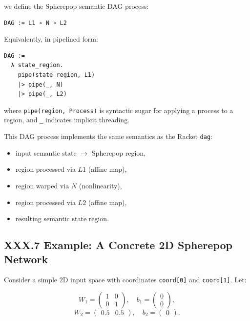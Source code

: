 \documentclass[12pt,letterpaper]{article}
\begin{document}
we define the Spherepop semantic DAG process:

\begin{verbatim}
DAG := L1 ∘ N ∘ L2
\end{verbatim}

Equivalently, in pipelined form:

\begin{verbatim}
DAG :=
  λ state_region.
    pipe(state_region, L1)
    |> pipe(_, N)
    |> pipe(_, L2)
\end{verbatim}

where \verb|pipe(region, Process)| is syntactic sugar for applying a process to a region, and \verb|_| indicates implicit threading.

This DAG process implements the same semantics as the Racket \verb|dag|:

\begin{itemize}
  \item input semantic state $\to$ Spherepop region,
  \item region processed via $L1$ (affine map),
  \item region warped via $N$ (nonlinearity),
  \item region processed via $L2$ (affine map),
  \item resulting semantic state region.
\end{itemize}

\subsection{XXX.7 Example: A Concrete 2D Spherepop Network}

Consider a simple 2D input space with coordinates \verb|coord[0]| and \verb|coord[1]|. Let:

\[
W_1 =
\begin{pmatrix}
1 & 0 \\
0 & 1
\end{pmatrix}, \quad
b_1 =
\begin{pmatrix}
0 \\ 0
\end{pmatrix},
\]
\[
W_2 =
\begin{pmatrix}
0.5 & 0.5
\end{pmatrix}, \quad
b_2 =
\begin{pmatrix}
0
\end{pmatrix}.
\]
\end{document}
